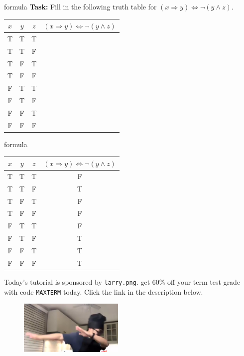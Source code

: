 \documentclass{beamer}
\begin{document}
\begin{frame}{formula}
\textbf{Task:} Fill in the following truth table for $(x \Rightarrow y) \Leftrightarrow \neg (y \land z)$.

\begin{center}
\begin{tabular}{|c|c|c|c|}
\hline
$x$ & $y$ & $z$ & $(x \Rightarrow y) \Leftrightarrow \neg (y \land z)$\\
\hline
T & T & T & \\
\hline
T & T & F & \\
\hline
T & F & T & \\
\hline
T & F & F & \\
\hline
F & T & T & \\
\hline
F & T & F & \\
\hline
F & F & T & \\
\hline
F & F & F & \\
\hline
\end{tabular}
\end{center}

\end{frame}

\begin{frame}{formula}
\begin{center}
\begin{tabular}{|c|c|c|c|}
\hline
$x$ & $y$ & $z$ & $(x \Rightarrow y) \Leftrightarrow \neg (y \land z)$\\
\hline
T & T & T & F\\
\hline
T & T & F & T\\
\hline
T & F & T & F\\
\hline
T & F & F & F\\
\hline
F & T & T & F\\
\hline
F & T & F & T\\
\hline
F & F & T & T\\
\hline
F & F & F & T\\
\hline
\end{tabular}
\end{center}
Today's tutorial is sponsored by \texttt{larry.png}. get 60\% off your term test grade with code \texttt{MAXTERM} today. Click the link in the description below.

\begin{figure}[h]
\centering
\includegraphics[width=5cm]{img/larry.png}
\end{figure}

\end{frame}
\end{document}
